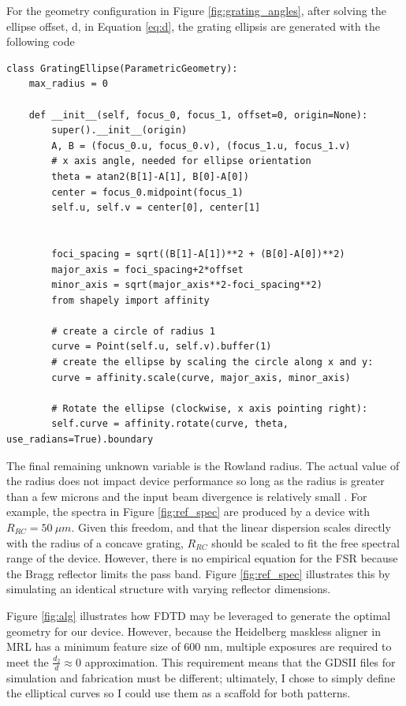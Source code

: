 \documentclass{article}
\begin{document}
    For the geometry configuration in Figure \ref{fig:grating_angles}, after solving the ellipse offset, d, in Equation \ref{eq:d}, the grating ellipsis are generated with the following code 
\begin{lstlisting}
class GratingEllipse(ParametricGeometry):
    max_radius = 0

    def __init__(self, focus_0, focus_1, offset=0, origin=None):
        super().__init__(origin)
        A, B = (focus_0.u, focus_0.v), (focus_1.u, focus_1.v)
        # x axis angle, needed for ellipse orientation
        theta = atan2(B[1]-A[1], B[0]-A[0])  
        center = focus_0.midpoint(focus_1)
        self.u, self.v = center[0], center[1]
        
        
        foci_spacing = sqrt((B[1]-A[1])**2 + (B[0]-A[0])**2)
        major_axis = foci_spacing+2*offset
        minor_axis = sqrt(major_axis**2-foci_spacing**2)
        from shapely import affinity
        
        # create a circle of radius 1
        curve = Point(self.u, self.v).buffer(1)
        # create the ellipse by scaling the circle along x and y:
        curve = affinity.scale(curve, major_axis, minor_axis)
        
        # Rotate the ellipse (clockwise, x axis pointing right):
        self.curve = affinity.rotate(curve, theta, use_radians=True).boundary
\end{lstlisting}
    The final remaining unknown variable is the Rowland radius. The actual value of the radius does not impact device performance so long as the radius is greater than a few microns and the input beam divergence is relatively small \cite{Packirisamy2012Mono-OrderGrating}. For example, the spectra in Figure \ref{fig:ref_spec} are produced by a device with $R_{RC} = 50 \ \mu m$. Given this freedom, and that the linear dispersion scales directly with the radius of a concave grating, $R_{RC}$ should be scaled to fit the free spectral range of the device. However, there is no empirical equation for the FSR because the Bragg reflector limits the pass band. Figure \ref{fig:ref_spec} illustrates this by simulating an identical structure with varying reflector dimensions.
    
    Figure \ref{fig:alg} illustrates how FDTD may be leveraged to generate the optimal geometry for our device. However, because the Heidelberg maskless aligner in MRL has a minimum feature size of 600 nm, multiple exposures are required to meet the $\frac{d_2}{d} \approx 0$ approximation. This requirement means that the GDSII files for simulation and fabrication must be different; ultimately, I chose to simply define the elliptical curves so I could use them as a scaffold for both patterns.
\end{document}
